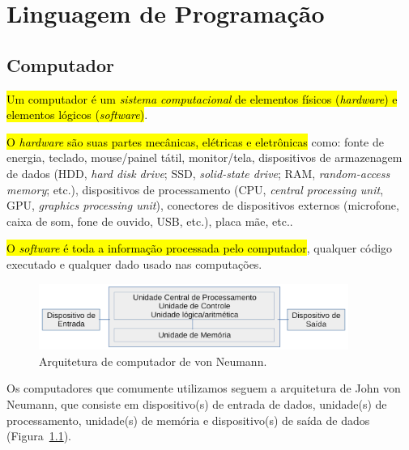 
\chapter{Linguagem de Programação}\label{cap_lingua}

\section{Computador}\label{cap_lim_sec_computador}

\hl{Um computador é um \emph{sistema computacional} de elementos físicos (\emph{hardware}) e elementos lógicos (\emph{software})}.

\hl{O \emph{hardware} são suas partes mecânicas, elétricas e eletrônicas} como: fonte de energia, teclado, mouse/painel tátil, monitor/tela, dispositivos de armazenagem de dados (HDD, \textit{hard disk drive}; SSD, \textit{solid-state drive}; RAM, \textit{random-access memory}; etc.), dispositivos de processamento (CPU, \textit{central processing unit}, GPU, \textit{graphics processing unit}), conectores de dispositivos externos (microfone, caixa de som, fone de ouvido, USB, etc.), placa mãe, etc..

\hl{O \emph{software} é toda a informação processada pelo computador}, qualquer código executado e qualquer dado usado nas computações.

\begin{figure}[H]
  \centering
  \includegraphics[max width=0.9\textwidth]{./cap_lingua/dados/fig_arqVonNeumann/fig}
  \caption[Arquitetura de von Neumann]{Arquitetura de computador de von Neumann.}
  \label{cap_lim_sec_computador:fig:arqVonNeumann}
\end{figure}

Os computadores que comumente utilizamos seguem a arquitetura de John von Neumann{\vonNeumann}, que consiste em dispositivo(s) de entrada de dados, unidade(s) de processamento, unidade(s) de memória e dispositivo(s) de saída de dados (Figura~\ref{cap_lim_sec_computador:fig:arqVonNeumann}).

